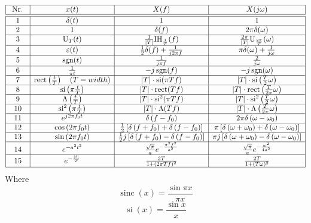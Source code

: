 $$
\begin{array}{|c|c|c|c|}
\hline \text { Nr. } & x(t) & X(f) & X(j \omega) \\
\hline \hline 1 & \delta(t) & 1 & 1 \\
\hline 2 & 1 & \delta(f) & 2 \pi \delta(\omega) \\
\hline 3 & \mathrm{U}_T(t) & \frac{1}{|T|} \mathrm{IH}_{\frac{1}{T}}(f) & \frac{2 \pi}{|T|} \mathrm{U}_{\frac{2 \pi}{T}}(\omega) \\
\hline 4 & \varepsilon(t) & \frac{1}{2} \delta(f)+\frac{1}{j 2 \pi f} & \pi \delta(\omega)+\frac{1}{j \omega} \\
\hline 5 & \operatorname{sgn}(t) & \frac{1}{j \pi f} & \frac{2}{j \omega} \\
\hline 6 & \frac{1}{\pi t} & -j \operatorname{sgn}(f) & -j \operatorname{sgn}(\omega) \\
\hline 7 & \operatorname{rect}\left(\frac{t}{T}\right)\quad (T=width) & |T| \cdot \operatorname{si}(\pi T f) & |T| \cdot \operatorname{si}\left(\frac{T}{2} \omega\right) \\
\hline 8 & \operatorname{si}\left(\pi \frac{t}{T}\right) & |T| \cdot \operatorname{rect}(T f) & |T| \cdot \operatorname{rect}\left(\frac{T}{2 \pi} \omega\right) \\
\hline 9 & \Lambda\left(\frac{t}{T}\right) & |T| \cdot \mathrm{si}^2(\pi T f) & |T| \cdot \operatorname{si}^2\left(\frac{T}{2} \omega\right) \\
\hline 10 & \mathrm{si}^2\left(\pi \frac{t}{T}\right) & |T| \cdot \Lambda(T f) & |T| \cdot \Lambda\left(\frac{T}{2 \pi} \omega\right) \\
\hline 11 & e^{j 2 \pi f_0 t} & \delta\left(f-f_0\right) & 2 \pi \delta\left(\omega-\omega_0\right) \\
\hline 12 & \cos \left(2 \pi f_0 t\right) & \frac{1}{2}\left[\delta\left(f+f_0\right)+\delta\left(f-f_0\right)\right] & \pi\left[\delta\left(\omega+\omega_0\right)+\delta\left(\omega-\omega_0\right)\right] \\
\hline 13 & \sin \left(2 \pi f_0 t\right) & \frac{1}{2} j\left[\delta\left(f+f_0\right)-\delta\left(f-f_0\right)\right] & \pi j\left[\delta\left(\omega+\omega_0\right)-\delta\left(\omega-\omega_0\right)\right] \\
\hline 14 & e^{-a^2 t^2} & \frac{\sqrt{\pi}}{a} e^{-\frac{\pi^2 f^2}{a^2}} & \frac{\sqrt{\pi}}{a} e^{-\frac{\omega^2}{4 a^2}} \\
\hline 15 & e^{-\frac{|t|}{T}} & \frac{2 T}{1+(2 \pi T f)^2} & \frac{2 T}{1+(T \omega)^2} \\
\hline
\end{array}
$$
Where 
$$
\operatorname{sinc}(x)=\frac{\sin \pi x}{\pi x}
$$
$$
\operatorname{si}(x)=\frac{\sin x}{x}
$$
